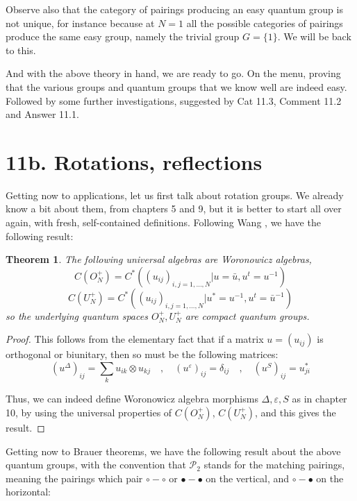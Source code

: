 \documentclass[12pt]{amsbook}
\newtheorem{theorem}{Theorem}[chapter]
\begin{document}
\bigskip

Observe also that the category of pairings producing an easy quantum group is not unique, for instance because at $N=1$ all the possible categories of pairings produce the same easy group, namely the trivial group $G=\{1\}$. We will be back to this.

\bigskip

And with the above theory in hand, we are ready to go. On the menu, proving that the various groups and quantum groups that we know well are indeed easy. Followed by some further investigations, suggested by Cat 11.3, Comment 11.2 and Answer 11.1.

\section*{11b. Rotations, reflections}

Getting now to applications, let us first talk about rotation groups. We already know a bit about them, from chapters 5 and 9, but it is better to start all over again, with fresh, self-contained definitions. Following Wang \cite{wan}, we have the following result:


\begin{theorem}
The following universal algebras are Woronowicz algebras,
$$C(O_N^+)=C^*\left((u_{ij})_{i,j=1,\ldots,N}\Big|u=\bar{u},u^t=u^{-1}\right)$$
$$C(U_N^+)=C^*\left((u_{ij})_{i,j=1,\ldots,N}\Big|u^*=u^{-1},u^t=\bar{u}^{-1}\right)$$
so the underlying quantum spaces $O_N^+,U_N^+$ are compact quantum groups.
\end{theorem}

\begin{proof}
This follows from the elementary fact that if a matrix $u=(u_{ij})$ is orthogonal or biunitary, then so must be the following matrices:
$$(u^\Delta)_{ij}=\sum_ku_{ik}\otimes u_{kj}\quad,\quad 
(u^\varepsilon)_{ij}=\delta_{ij}\quad,\quad
(u^S)_{ij}=u_{ji}^*$$

Thus, we can indeed define Woronowicz algebra morphisms $\Delta,\varepsilon,S$ as in chapter 10, by using the universal properties of $C(O_N^+)$, $C(U_N^+)$, and this gives the result.
\end{proof}

Getting now to Brauer theorems, we have the following result about the above quantum groups, with the convention that $\mathcal P_2$ stands for the matching pairings, meaning the pairings which pair $\circ-\circ$ or $\bullet-\bullet$ on the vertical, and $\circ-\bullet$ on the horizontal:
\end{document}
